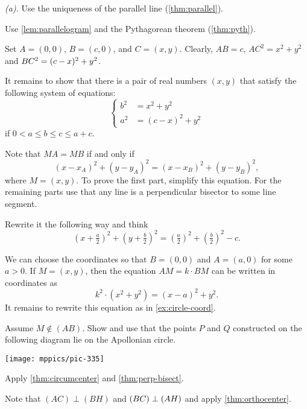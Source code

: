 \begin{multicols}{2}
 \textit{(a).} Use the uniqueness of the parallel line (\ref{thm:parallel}).

 Use \ref{lem:parallelogram} and the Pythagorean theorem (\ref{thm:pyth}).

Set $A=(0,0)$, $B=(c,0)$, and $C=(x,y)$.
Clearly, $AB=c$,
$AC^2=x^2+y^2$ and $BC^2\z=(c-x)^2+y^2$.

It remains to show that there is a pair of real numbers $(x,y)$ 
that satisfy the following system of equations:
$$
\left\{
\begin{aligned}
b^2&=x^2+y^2
\\
a^2&=(c-x)^2+y^2
\end{aligned}
\right.
$$
if $0<a\le b\le c\le a+c$.

 Note that $MA=MB$ if and only if
\[(x-x_A)^2+(y-y_A)^2=(x-x_B)^2+(y-y_B)^2,\]
where $M=(x,y)$. 
To prove the first part, simplify this equation.
For the remaining parts use that any line is a perpendicular bisector to some line segment.

 Rewrite it the following way and think 
\[(x+\tfrac a2)^2+(y+\tfrac b2)^2=(\tfrac a2)^2+(\tfrac b2)^2-c.\]


We can choose the coordinates so that $B=(0,0)$ and $A=(a,0)$ for some $a>0$.
If $M=(x,y)$, then the equation $AM=k\cdot BM$ can be written in coordinates as 
\[k^2\cdot(x^2+y^2)=(x-a)^2+y^2.\]
It remains to rewrite this equation as in \ref{ex:circle-coord}.

Assume $M\notin(AB)$.
Show and use that the points $P$ and $Q$ constructed on the following diagram lie on the Apollonian circle.

\begin{Figure}
\centering
\texttt{[image: mppics/pic-335]}
\end{Figure}


\setcounter{eqtn}{0}

Apply \ref{thm:circumcenter} and \ref{thm:perp-bisect}.

Note that $(AC)\perp (BH)$ and $(BC)\z\perp (AH)$ and apply \ref{thm:orthocenter}.


\end{multicols}
